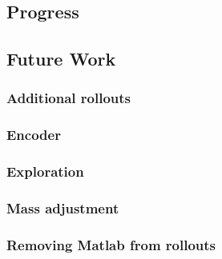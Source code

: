 \documentclass[twoside,twocolumn,12pt]{article}
\begin{document}

\clearpage
{}%
\subsection{Progress}

\subsection{Future Work}


\subsubsection{Additional rollouts}


\subsubsection{Encoder}


\subsubsection{Exploration}


\subsubsection{Mass adjustment}


\subsubsection{Removing Matlab from rollouts}


\end{document}
